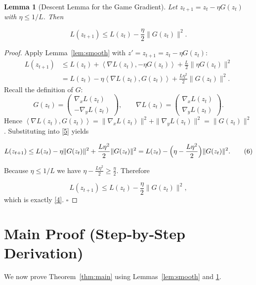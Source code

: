 \documentclass{article}
\newtheorem{lemma}{Lemma}
\newcommand{\inner}[2]{\left\langle #1,#2 \right\rangle}
\begin{document}
\begin{lemma}[Descent Lemma for the Game Gradient]\label{lem:descent}
Let \(z_{t+1}=z_t-\eta G(z_t)\) with \(\eta\le 1/L\).  Then

\[
L(z_{t+1})\le L(z_t)-\frac{\eta}{2}\|G(z_t)\|^{2}.
\tag{4}
\]
\end{lemma}
\begin{proof}
Apply Lemma~\ref{lem:smooth} with \(z'=z_{t+1}=z_t-\eta G(z_t)\):
\[
\begin{aligned}
L(z_{t+1}) 
&\le L(z_t)+\inner{\nabla L(z_t)}{-\eta G(z_t)}+\frac{L}{2}\|\eta G(z_t)\|^{2}\\[4pt]
&= L(z_t)-\eta\inner{\nabla L(z_t)}{G(z_t)}+\frac{L\eta^{2}}{2}\|G(z_t)\|^{2}.
\end{aligned}
\tag{5}
\]
Recall the definition of \(G\):
\[
G(z_t)=\begin{pmatrix}\nabla_x L(z_t)\\ -\nabla_y L(z_t)\end{pmatrix},
\qquad
\nabla L(z_t)=\begin{pmatrix}\nabla_x L(z_t)\\ \nabla_y L(z_t)\end{pmatrix}.
\]
Hence \(\inner{\nabla L(z_t)}{G(z_t)}=\|\nabla_x L(z_t)\|^{2}+\|\nabla_y L(z_t)\|^{2}
=\|G(z_t)\|^{2}\).  Substituting into \eqref{5} yields  

\[
L(z_{t+1})\le L(z_t)-\eta\|G(z_t)\|^{2}+\frac{L\eta^{2}}{2}\|G(z_t)\|^{2}
= L(z_t)-\Bigl(\eta-\frac{L\eta^{2}}{2}\Bigr)\|G(z_t)\|^{2}.
\tag{6}
\]

Because \(\eta\le 1/L\) we have \(\eta-\tfrac{L\eta^{2}}{2}\ge \tfrac{\eta}{2}\).  Therefore  

\[
L(z_{t+1})\le L(z_t)-\frac{\eta}{2}\|G(z_t)\|^{2},
\]
which is exactly \eqref{4}. \hfill\(\square\)
\end{proof}

\section*{Main Proof (Step‑by‑Step Derivation)}
We now prove Theorem~\ref{thm:main} using Lemmas~\ref{lem:smooth} and \ref{lem:descent}.
\end{document}
